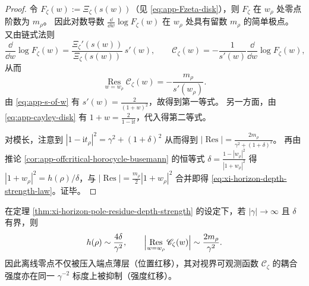 \begin{proof}
令 \(F_{\zeta}(w):=\Xi_{\zeta}(s(w))\)（见 \eqref{eq:app-Fzeta-disk}），则 \(F_{\zeta}\) 在 \(w_{\rho}\) 处零点阶数为 \(m_{\rho}\)。
因此对数导数 \(\frac{\dd}{\dd w}\log F_{\zeta}(w)\) 在 \(w_{\rho}\) 处具有留数 \(m_{\rho}\) 的简单极点。
又由链式法则
\[
\frac{\dd}{\dd w}\log F_{\zeta}(w)
=\frac{\Xi_{\zeta}'(s(w))}{\Xi_{\zeta}(s(w))}\,s'(w),
\qquad
\mathscr{C}_{\zeta}(w)=-\frac{1}{s'(w)}\frac{\dd}{\dd w}\log F_{\zeta}(w),
\]
从而
\[
\operatorname*{Res}_{w=w_{\rho}}\mathscr{C}_{\zeta}(w)
=-\frac{m_{\rho}}{s'(w_{\rho})}.
\]
由 \eqref{eq:app-s-of-w} 有 \(s'(w)=\frac{2}{(1+w)^2}\)，故得到第一等式。
另一方面，由 \eqref{eq:app-cayley-disk} 有 \(1+w=\frac{2}{1-\mathrm{i}t}\)，代入得第二等式。
\par
对模长，注意到
\(
|1-\mathrm{i}t_{\rho}|^2=\gamma^2+(1+\delta)^2
\)
从而得到 \(\bigl|\operatorname*{Res}\bigr|=\frac{2m_{\rho}}{\gamma^2+(1+\delta)^2}\)。
再由推论 \ref{cor:app-offcritical-horocycle-busemann} 的恒等式
\(
\delta=\frac{1-|w_{\rho}|^2}{|1+w_{\rho}|^2}
\)
得 \(|1+w_{\rho}|^2=h(\rho)/\delta\)，与
\(
\bigl|\operatorname*{Res}\bigr|=\frac{m_{\rho}}{2}|1+w_{\rho}|^2
\)
合并即得 \eqref{eq:xi-horizon-depth-strength-law}。证毕。
\end{proof}

\begin{corollary}\label{cor:xi-horizon-residue-redshift}
在定理 \ref{thm:xi-horizon-pole-residue-depth-strength} 的设定下，若 \(|\gamma|\to\infty\) 且 \(\delta\) 有界，则
\[
h(\rho)\sim \frac{4\delta}{\gamma^2},
\qquad
\Bigl|\operatorname*{Res}_{w=w_{\rho}}\mathscr{C}_{\zeta}(w)\Bigr|\sim \frac{2m_{\rho}}{\gamma^2}.
\]
因此离线零点不仅被压入端点薄层（位置红移），其对视界可观测函数 \(\mathscr{C}_{\zeta}\) 的耦合强度亦在同一 \(\gamma^{-2}\) 标度上被抑制（强度红移）。
\end{corollary}

